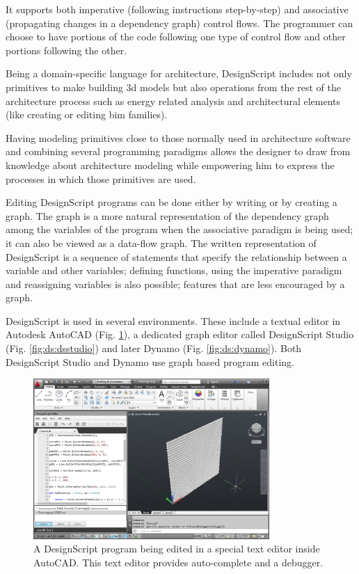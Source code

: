 \documentclass{./llncs2e/llncs}
\begin{document}
	It supports both imperative (following instructions step-by-step) and associative (propagating changes in a dependency graph) control flows. 
	The programmer can choose to have portions of the code following one type of control flow and other portions following the other.
	
	Being a domain-specific language for architecture, DesignScript includes not only primitives to make building 3d models but also operations from the rest of the architecture process such as energy related analysis and architectural elements (like creating or editing \ac{bim} families).
	
	Having modeling primitives close to those normally used in architecture software and combining several programming paradigms allows the designer to draw from knowledge about architecture modeling while empowering him to express the processes in which those primitives are used.
	
	Editing DesignScript programs can be done either by writing or by creating a graph. 
	The graph is a more natural representation of the dependency graph among the variables of the program when the associative paradigm is being used; it can also be viewed as a data-flow graph. 
	The written representation of DesignScript is a sequence of statements that specify the relationship between a variable and other variables; defining functions, using the imperative paradigm and reassigning variables is also possible; features that are less encouraged by a graph.
	
	DesignScript is used in several environments. 
	These include a textual editor in Autodesk AutoCAD (Fig. \ref{fig:ds:autocad}), a dedicated graph editor called DesignScript Studio (Fig. \ref{fig:ds:dsstudio}) and later Dynamo (Fig. \ref{fig:ds:dynamo}). 
	Both DesignScript Studio and Dynamo use graph based program editing.
	
	\begin{figure}
		\centering
		\includegraphics[width=0.8\textwidth]{img/ds_autocad}
		\caption{A DesignScript program being edited in a special text editor inside AutoCAD. This text editor provides auto-complete and a debugger.}
		\label{fig:ds:autocad}
	\end{figure} 
	
\end{document}
